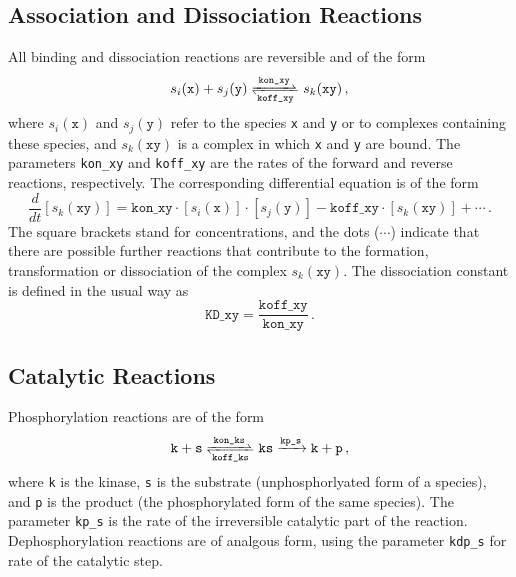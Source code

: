 \documentclass[12pt]{article}
\begin{document}
	\subsection{Association and Dissociation Reactions}
	
	All binding and dissociation reactions are reversible and of the form
	\begin{equation}
		s_{i}(\texttt{x})+s_{j}(\texttt{y})\ce{<=>[\texttt{kon\_xy}][\texttt{koff\_xy}]}s_{k}(\texttt{xy})\,,
	\end{equation}
	where $s_{i}(\texttt{x})$ and $s_{j}(\texttt{y})$ refer to the species
	\texttt{x} and \texttt{y} or to complexes containing these species,
	and $s_{k}(\texttt{xy})$ is a complex in which \texttt{x} and \texttt{y}
	are bound. The parameters \texttt{kon\_xy} and \texttt{koff\_xy} are the rates of the forward and reverse reactions, respectively. The corresponding differential equation is of the form 
	\begin{equation}
		\frac{d}{dt}[s_{k}(\texttt{xy})]=\texttt{kon\_xy}\cdot[s_{i}(\texttt{x})]\cdot[s_{j}(\texttt{y})]-\texttt{koff\_xy}\cdot[s_{k}(\texttt{xy})]+\cdots\,.
	\end{equation}
	The square brackets stand for concentrations, and the dots ($\cdots$)
	indicate that there are possible further reactions that contribute
	to the formation, transformation or dissociation of the complex $s_{k}(\texttt{xy})$.
	The dissociation constant is defined in the usual way as 
	\begin{equation}
		\texttt{KD\_xy}=\frac{\texttt{koff\_xy}}{\texttt{kon\_xy}}\,.
	\end{equation}
	
	
	\subsection{Catalytic Reactions}
	
	Phosphorylation reactions are of the form 
	\begin{equation}
		\ce{\texttt{k} + \texttt{s} <=>[\texttt{kon\_ks}][\texttt{koff\_ks}] \texttt{ks} ->[\texttt{kp\_s}] \texttt{k} + \texttt{p}}\,,
	\end{equation}
	where \texttt{k} is the kinase, \texttt{s}
	is the substrate (unphosphorlyated form of a species),
	and \texttt{p} is the product (the phosphorylated form of the same species). The parameter \texttt{kp\_s} is the rate
	of the irreversible catalytic part of the reaction. Dephosphorylation reactions are of analgous form, using the parameter \texttt{kdp\_s} for rate of the catalytic step.
	
\end{document}

